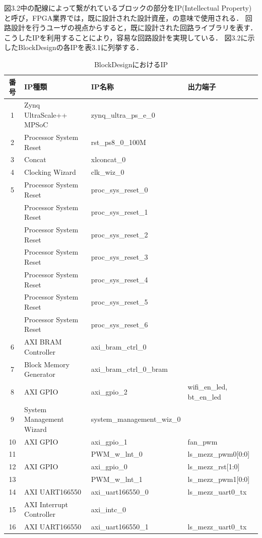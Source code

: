 \documentclass[11pt,a4j]{jreport}
\begin{document}
図3.2中の配線によって繋がれているブロックの部分をIP(Intellectual Property)
と呼び，FPGA業界では，既に設計された設計資産，の意味で使用される．
回路設計を行うユーザの視点からすると，既に設計された回路ライブラリを表す．
こうしたIPを利用することにより，容易な回路設計を実現している．
図3.2に示したBlockDesignの各IPを表3.1に列挙する．
\begin{table}[H]
  \caption{BlockDesignにおけるIP}
  \label{table:SpeedOfLight}
  \centering
   \begin{tabular}{clll}
    \hline
    番号 & IP種類 & IP名称 & 出力端子 \\
    \hline \hline
    1 & Zynq UltraScale++ MPSoC & zynq_ultra_ps_e_0 & \\
    2 & Processor System Reset & rst_ps8_0_100M & \\
    3 & Concat & xlconcat_0 & \\
    4 & Clocking Wizard & clk_wiz_0 &\\
    5 & Processor System Reset & proc_sys_reset_0 & \\
     & Processor System Reset & proc_sys_reset_1 & \\
     & Processor System Reset & proc_sys_reset_2 & \\
     & Processor System Reset & proc_sys_reset_3 & \\
     & Processor System Reset & proc_sys_reset_4 & \\
     & Processor System Reset & proc_sys_reset_5 & \\
     & Processor System Reset & proc_sys_reset_6 & \\
    6 & AXI BRAM Controller & axi_bram_ctrl_0 & \\
    7 & Block Memory Generator & axi_bram_ctrl_0_bram & \\
    8 & AXI GPIO & axi_gpio_2 & wifi_en_led, bt_en_led\\
    9 & System Management Wizard & system_management_wiz_0 & \\
    10 & AXI GPIO & axi_gpio_1 & fan_pwm \\
    11 & & PWM_w_lnt_0 & ls_mezz_pwm0[0:0] \\
    12 & AXI GPIO & axi_gpio_0 & ls_mezz_rst[1:0] \\
    13 & & PWM_w_lnt_1 & ls_mezz_pwm1[0:0] \\
    14 & AXI UART166550 & axi_uart166550_0 & ls_mezz_uart0_tx \\
    15 & AXI Interrupt Controller & axi_intc_0 & \\
    16 & AXI UART166550 & axi_uart166550_1 & ls_mezz_uart0_tx \\

\end{tabular}
\end{table}
\end{document}

